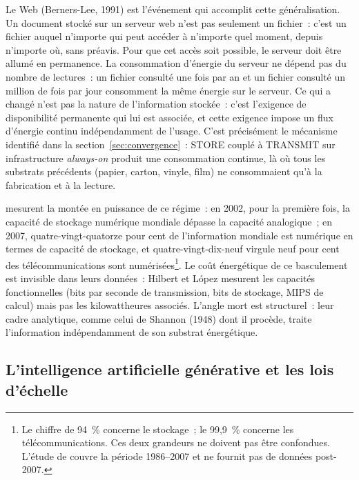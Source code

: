 %
Le Web (Berners-Lee, 1991) est l'événement qui accomplit cette généralisation. Un document stocké sur un serveur web n'est pas seulement un fichier~: c'est un fichier auquel n'importe qui peut accéder à n'importe quel moment, depuis n'importe où, sans préavis. Pour que cet accès soit possible, le serveur doit être allumé en permanence. La consommation d'énergie du serveur ne dépend pas du nombre de lectures~: un fichier consulté une fois par an et un fichier consulté un million de fois par jour consomment la même énergie sur le serveur. Ce qui a changé n'est pas la nature de l'information stockée~: c'est l'exigence de disponibilité permanente qui lui est associée, et cette exigence impose un flux d'énergie continu indépendamment de l'usage. C'est précisément le mécanisme identifié dans la section~\ref{sec:convergence}~: STORE couplé à TRANSMIT sur infrastructure \emph{always-on} produit une consommation continue, là où tous les substrats précédents (papier, carton, vinyle, film) ne consommaient qu'à la fabrication et à la lecture.

%
\textcite{hilbert_worlds_2011} mesurent la montée en puissance de ce régime~: en 2002, pour la première fois, la capacité de stockage numérique mondiale dépasse la capacité analogique~; en 2007, quatre-vingt-quatorze pour cent de l'information mondiale est numérique en termes de capacité de stockage, et quatre-vingt-dix-neuf virgule neuf pour cent des télécommunications sont numérisées\footnote{Le chiffre de 94~\% concerne le stockage~; le 99,9~\% concerne les télécommunications. Ces deux grandeurs ne doivent pas être confondues. L'étude de \textcite{hilbert_worlds_2011} couvre la période 1986--2007 et ne fournit pas de données post-2007.}. Le coût énergétique de ce basculement est invisible dans leurs données~: Hilbert et López mesurent les capacités fonctionnelles (bits par seconde de transmission, bits de stockage, MIPS de calcul) mais pas les kilowattheures associés. L'angle mort est structurel~: leur cadre analytique, comme celui de Shannon (1948) dont il procède, traite l'information indépendamment de son substrat énergétique.


\subsection{L'intelligence artificielle générative et les lois d'échelle}\label{subsec:genai}

